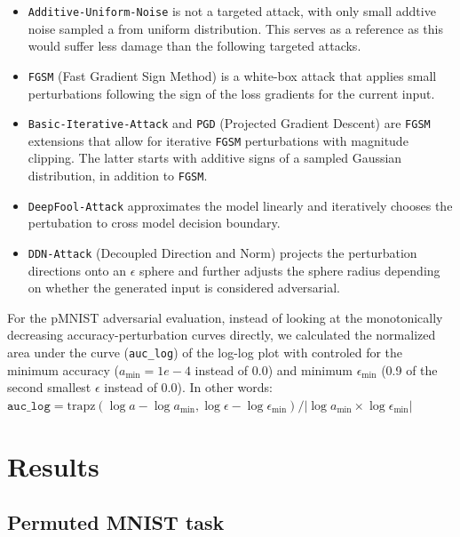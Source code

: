 \documentclass[manuscript,screen,review=false, nonacm]{acmart}
\begin{document}
\begin{itemize}
    \item \texttt{Additive-Uniform-Noise} is not a targeted attack, with only small addtive noise sampled a from uniform distribution. This serves as a reference as this would suffer less damage than the following targeted attacks. 
    \item \texttt{FGSM} (Fast Gradient Sign Method) \cite{Goodfellow2014-bu} is a white-box attack that applies small perturbations following the sign of the loss gradients for the current input. 
    \item \texttt{Basic-Iterative-Attack} \cite{Kurakin2016-mb} and \texttt{PGD} (Projected Gradient Descent) \cite{Madry2017-dx} are \texttt{FGSM} extensions that allow for iterative \texttt{FGSM} perturbations with magnitude clipping. The latter starts with additive signs of a sampled Gaussian distribution, in addition to \texttt{FGSM}.
    \item \texttt{DeepFool-Attack} \cite{Moosavi-Dezfooli2016-qf}  approximates the model linearly and iteratively chooses the pertubation to cross model decision boundary. 
    \item \texttt{DDN-Attack} (Decoupled Direction and Norm)  \cite{Rony2018-tp} projects the perturbation directions onto an $\epsilon$ sphere and further adjusts the sphere radius depending on whether the generated input is considered adversarial. 
\end{itemize}

For the pMNIST adversarial evaluation, instead of looking at the monotonically decreasing accuracy-perturbation curves directly, we calculated the normalized area under the curve (\texttt{auc\_log}) of the log-log plot with controled for the minimum accuracy ($a_{\mathrm{min}} = 1e-4$ instead of 0.0) and minimum $\epsilon_{\mathrm{min}}$ (0.9 of the second smallest $\epsilon$ instead of 0.0). In other words: $ \texttt{auc\_log} = \mathrm{trapz}(\log a - \log a_{\mathrm{min}} ,\log \epsilon - \log \epsilon_{\mathrm{min}}) / |\log a_{\mathrm{min}} \times \log  \epsilon_{\mathrm{min}}| $

\section{Results}

\subsection{Permuted MNIST task}
\end{document}
